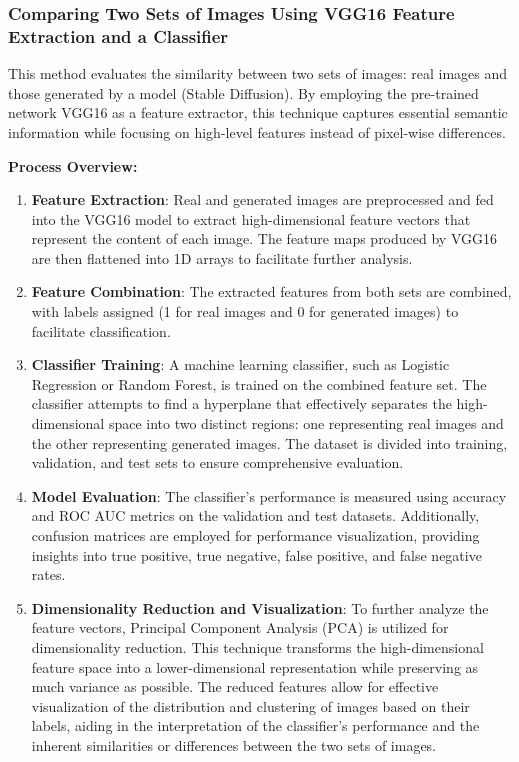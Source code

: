 \documentclass[12pt,DIV14,BCOR12mm,a4paper,footinclude=false,headinclude,parskip=half-,twoside,openright,cleardoublepage=empty,toc=index,bibliography=totoc,listof=totoc]{scrreprt}
\numberwithin{equation}{chapter}
\begin{document}
\subsubsection{Comparing Two Sets of Images Using VGG16 Feature Extraction and a Classifier}

This method evaluates the similarity between two sets of images: real images and those generated by a model (Stable Diffusion). By employing the pre-trained network VGG16 as a feature extractor, this technique captures essential semantic information while focusing on high-level features instead of pixel-wise differences.

\textbf{Process Overview:}
\begin{enumerate}
    \item \textbf{Feature Extraction}: Real and generated images are preprocessed and fed into the VGG16 model to extract high-dimensional feature vectors that represent the content of each image. The feature maps produced by VGG16 are then flattened into 1D arrays to facilitate further analysis.

    \item \textbf{Feature Combination}: The extracted features from both sets are combined, with labels assigned (1 for real images and 0 for generated images) to facilitate classification.

    \item \textbf{Classifier Training}: A machine learning classifier, such as Logistic Regression or Random Forest, is trained on the combined feature set. The classifier attempts to find a hyperplane that effectively separates the high-dimensional space into two distinct regions: one representing real images and the other representing generated images. The dataset is divided into training, validation, and test sets to ensure comprehensive evaluation.

    \item \textbf{Model Evaluation}: The classifier's performance is measured using accuracy and ROC AUC metrics on the validation and test datasets. Additionally, confusion matrices are employed for performance visualization, providing insights into true positive, true negative, false positive, and false negative rates.

    \item \textbf{Dimensionality Reduction and Visualization}: To further analyze the feature vectors, Principal Component Analysis (PCA) is utilized for dimensionality reduction. This technique transforms the high-dimensional feature space into a lower-dimensional representation while preserving as much variance as possible. The reduced features allow for effective visualization of the distribution and clustering of images based on their labels, aiding in the interpretation of the classifier's performance and the inherent similarities or differences between the two sets of images.
\end{enumerate}
\end{document}
